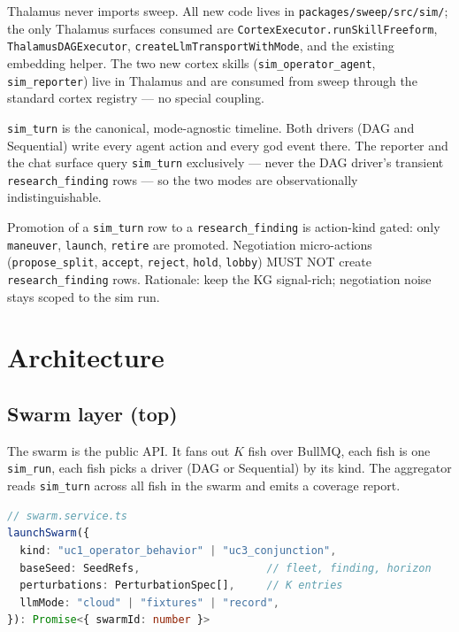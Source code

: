 \begin{invariant}
Thalamus never imports sweep. All new code lives in \texttt{packages/sweep/src/sim/}; the only Thalamus surfaces consumed are \texttt{CortexExecutor.runSkillFreeform}, \texttt{ThalamusDAGExecutor}, \texttt{createLlmTransportWithMode}, and the existing embedding helper. The two new cortex skills (\texttt{sim\_operator\_agent}, \texttt{sim\_reporter}) live in Thalamus and are consumed from sweep through the standard cortex registry --- no special coupling.
\end{invariant}
\begin{invariant}
\texttt{sim\_turn} is the canonical, mode-agnostic timeline. Both drivers (DAG and Sequential) write every agent action and every god event there. The reporter and the chat surface query \texttt{sim\_turn} exclusively --- never the DAG driver's transient \texttt{research\_finding} rows --- so the two modes are observationally indistinguishable.
\end{invariant}
\begin{invariant}
Promotion of a \texttt{sim\_turn} row to a \texttt{research\_finding} is action-kind gated: only \texttt{maneuver}, \texttt{launch}, \texttt{retire} are promoted. Negotiation micro-actions (\texttt{propose\_split}, \texttt{accept}, \texttt{reject}, \texttt{hold}, \texttt{lobby}) MUST NOT create \texttt{research\_finding} rows. Rationale: keep the KG signal-rich; negotiation noise stays scoped to the sim run.
\end{invariant}

\section{Architecture}

\subsection{Swarm layer (top)}
The swarm is the public API. It fans out $K$ fish over BullMQ, each fish is one \texttt{sim\_run}, each fish picks a driver (DAG or Sequential) by its kind. The aggregator reads \texttt{sim\_turn} across all fish in the swarm and emits a coverage report.

\begin{lstlisting}[language=TypeScript]
// swarm.service.ts
launchSwarm({
  kind: "uc1_operator_behavior" | "uc3_conjunction",
  baseSeed: SeedRefs,                    // fleet, finding, horizon
  perturbations: PerturbationSpec[],     // K entries
  llmMode: "cloud" | "fixtures" | "record",
}): Promise<{ swarmId: number }>
\end{lstlisting}

